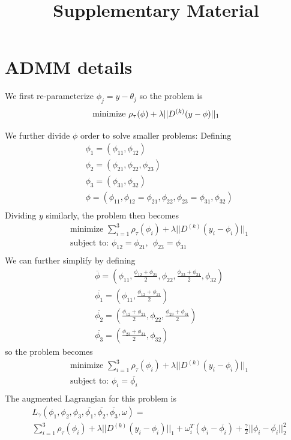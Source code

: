 \documentclass[12pt]{article}
\begin{document}
	\title{Supplementary Material}	 
	
	\section{ADMM details}
	We first re-parameterize $\phi_j = y-\theta_j$ so the problem is
	\begin{equation}
	\text{minimize } \rho_\tau(\phi) + \lambda||D^{(k)}(y-\phi)||_1\\
	\end{equation}
	
	
	We further divide $\phi$ order to solve smaller problems: Defining
	\begin{align}
	&\phi_1 = (\phi_{11}, \phi_{12})\\
	&\phi_2 = (\phi_{21}, \phi_{22}, \phi_{23})\\
	&\phi_3 = (\phi_{31}, \phi_{32})\\
	&\phi = (\phi_{11}, \phi_{12}=\phi_{21}, \phi_{22}, \phi_{23}=\phi_{31}, \phi_{32}) \\
	\end{align}
	Dividing $y$ similarly, the problem then becomes 
	\begin{align}
	&\text{minimize } \sum_{i=1}^3 \rho_\tau(\phi_i) + \lambda||D^{(k)}(y_i-\phi_i)||_1\\
	&\text{subject to: } \phi_{12}=\phi_{21}, ~~ \phi_{23}=\phi_{31}\\
	\end{align}
	We can further simplify by defining 
	\begin{align}
	&\overline{\phi} = (\phi_{11}, \frac{\phi_{12}+\phi_{21}}{2}, \phi_{22}, \frac{\phi_{23}+\phi_{31}}{2}, \phi_{32}) \\
	&\overline{\phi_1} = (\phi_{11}, \frac{\phi_{12}+\phi_{21}}{2})\\
	&\overline{\phi_2} = ( \frac{\phi_{12}+\phi_{21}}{2}, \phi_{22}, \frac{\phi_{23}+\phi_{31}}{2})\\
	&\overline{\phi_3} = (\frac{\phi_{23}+\phi_{31}}{2}, \phi_{32})
	\end{align}
	so the problem becomes
	\begin{align}
	&\text{minimize } \sum_{i=1}^3 \rho_\tau(\phi_i) + \lambda||D^{(k)}(y_i-\phi_i)||_1\\
	&\text{subject to: } \phi_{i}=\overline{\phi_i}\\
	\end{align}
	The augmented Lagrangian for this problem is 
	\begin{align}
	&L_\gamma(\phi_1,\phi_2, \phi_3, \overline{\phi_1}, \overline{\phi_2}, \overline{\phi_3}, \omega) = \\
	&\sum_{i=1}^3 \rho_\tau(\phi_i) + \lambda||D^{(k)}(y_i-\phi_i)||_1 + \omega_i^T(\phi_i - \overline{\phi_i}) + \frac{\gamma}{2}||\phi_i - \overline{\phi_i}||_2^2
	\end{align}
\end{document}
